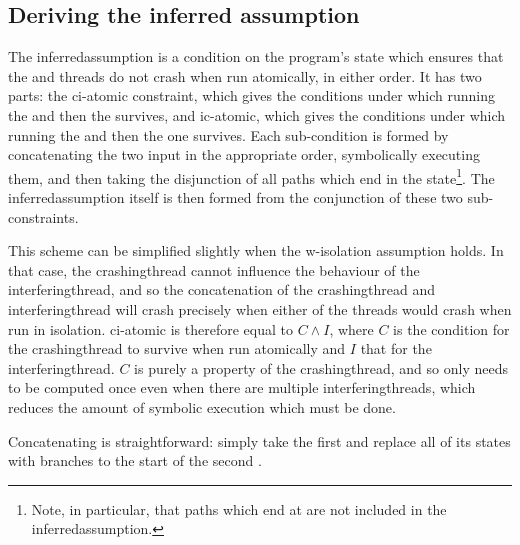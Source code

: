 \subsection{Deriving the inferred assumption}

\label{sect:derive:inferred_assumption}

The \gls{inferredassumption} is a condition on the program's state
which ensures that the  and
 threads do not crash when run
atomically, in either order.  It has two parts: the \gls{ci-atomic}
constraint, which gives the conditions under which running the
 {\StateMachine} and then the
 {\StateMachine} survives, and
\gls{ic-atomic}, which gives the conditions under which running the
 {\StateMachine} and then the
 one survives.  Each sub-condition
is formed by concatenating the two input {\StateMachines} in the
appropriate order, symbolically executing them, and then taking the
disjunction of all paths which end in the {\stSurvive}
state\footnote{Note, in particular, that paths which end at
  {\stUnreached} are not included in the \gls{inferredassumption}.}.
The \gls{inferredassumption} itself is then formed from the
conjunction of these two sub-constraints.

This scheme can be simplified slightly when the \gls{w-isolation}
assumption holds.  In that case, the \gls{crashingthread} cannot
influence the behaviour of the \gls{interferingthread}, and so the
concatenation of the \gls{crashingthread} and \gls{interferingthread}
will crash precisely when either of the threads would crash when run
in isolation.  \Gls{ci-atomic} is therefore equal to $C \wedge I$,
where $C$ is the condition for the \gls{crashingthread} to survive
when run atomically and $I$ that for the \gls{interferingthread}.  $C$
is purely a property of the \gls{crashingthread}, and so only needs to
be computed once even when there are multiple
\glspl{interferingthread}, which reduces the amount of symbolic
execution which must be done.

Concatenating {\StateMachines} is straightforward: simply take the
first {\StateMachine} and replace all of its {\stSurvive} states
with branches to the start of the second {\StateMachine}.

